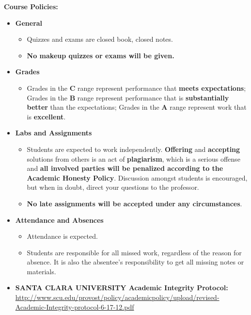 \documentclass[11pt]{article}
\begin{document}
\textbf {\large Course Policies:}
\begin{itemize}
	\item \textbf {General}
		\begin{itemize}
			\item Quizzes and exams are closed book, closed notes.
			\item \textbf {No makeup quizzes or exams will be given.}
		\end{itemize}
	\item \textbf {Grades}
		\begin{itemize}
			\item Grades in the \textbf{C} range represent performance that \textbf{meets expectations}; 
			Grades in the \textbf{B} range represent performance that is \textbf{substantially better} 
			than the expectations; Grades in the \textbf{A} range represent work that is \textbf{excellent}.
		\end{itemize}
	\item \textbf {Labs and Assignments}
		\begin{itemize}
			\item Students are expected to work independently. \textbf{Offering} and \textbf{accepting} 
			solutions from others is an act of \textbf{plagiarism}, which is a serious offense and 
			\textbf{all involved parties will be penalized according to the Academic Honesty Policy}. 
			Discussion amongst students is encouraged, but when in doubt, direct your questions to the 
			professor.
			\item \textbf{No late assignments will be accepted under any circumstances}.
		\end{itemize}
	\item \textbf{Attendance and Absences}
		\begin{itemize}
			\item Attendance is expected. 
			\item Students are responsible for all missed work, regardless of the reason for absence. 
			It is also the absentee's responsibility to get all missing notes or materials. 
		\end{itemize}

\item \textbf {\large SANTA CLARA UNIVERSITY Academic Integrity Protocol:} \\
{\tiny \url{http://www.scu.edu/provost/policy/academicpolicy/upload/revised-Academic-Integrity-protocol-6-17-12.pdf}}


\end{itemize}
\end{document}
